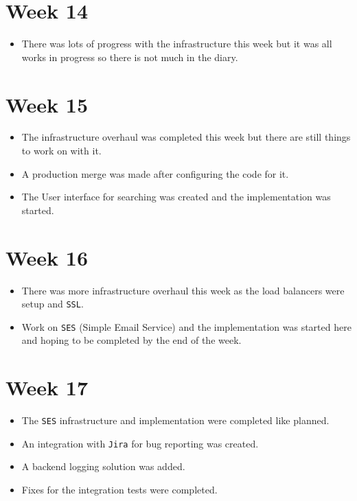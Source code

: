 \documentclass[]{project_report}
\begin{document}
\section{Week 14}
\begin{itemize}
    \item There was lots of progress with the infrastructure this week but it was all works in progress so there is not much in the diary.
\end{itemize}

\section{Week 15}
\begin{itemize}
    \item The infrastructure overhaul was completed this week but there are still things to work on with it.
    \item A production merge was made after configuring the code for it.
    \item The User interface for searching was created and the implementation was started.
\end{itemize}

\section{Week 16}
\begin{itemize}
    \item There was more infrastructure overhaul this week as the load balancers were setup and \texttt{SSL}.
    \item Work on \texttt{SES} (Simple Email Service) and the implementation was started here and hoping to be completed by the end of the week.
\end{itemize}

\section{Week 17}
\begin{itemize}
    \item The \texttt{SES} infrastructure and implementation were completed like planned.
    \item An integration with \texttt{Jira} for bug reporting was created.
    \item A backend logging solution was added.
    \item Fixes for the integration tests were completed.
\end{itemize}
\end{document}
